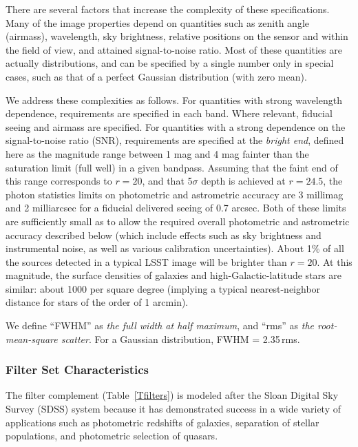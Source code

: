 There are several factors that increase the complexity of these
specifications. Many of the image properties depend on quantities such
as zenith angle (airmass), wavelength, sky brightness, relative positions
on the sensor and within the field of view, and attained signal-to-noise
ratio.  Most of these quantities are actually distributions, and can be
specified by a single number only in special cases, such as that of a
perfect Gaussian distribution (with zero mean).

We address these complexities as follows. For quantities with strong
wavelength dependence, requirements are specified in each band. Where
relevant, fiducial seeing and airmass are specified. For quantities with a
strong dependence on the signal-to-noise ratio (SNR), requirements are
specified at the {\it bright end}, defined here as the magnitude range
between 1 mag and 4 mag fainter than the saturation limit (full well) in a given
bandpass.  Assuming that the faint end of this range corresponds to $r=20$,
and that 5$\sigma$ depth is achieved at $r=24.5$, the photon statistics
limits on photometric and astrometric accuracy are 3 millimag and 2
milliarcsec for a fiducial delivered seeing of 0.7 arcsec. Both of these
limits are sufficiently small as to allow the required overall photometric
and astrometric accuracy described below (which include effects such as sky
brightness and instrumental noise, as well as various calibration
uncertainties).  About 1\% of all the sources detected in a typical LSST
image will be brighter than $r=20$. At this magnitude, the surface
densities of galaxies and high-Galactic-latitude stars are similar: about
1000 per square degree (implying a typical nearest-neighbor distance for
stars of the order of 1 arcmin).

We define ``FWHM'' as {\it the full width at half maximum}, and ``rms'' as
{\it the root-mean-square scatter}. For a Gaussian distribution, FWHM =
2.35\,rms.


\subsubsection{Filter Set Characteristics}

The filter complement (Table~\ref{Tfilters}) is modeled after the Sloan
Digital Sky Survey (SDSS) system because it has demonstrated success in a
wide variety of applications such as photometric redshifts of galaxies,
separation of stellar populations, and photometric selection of quasars.

